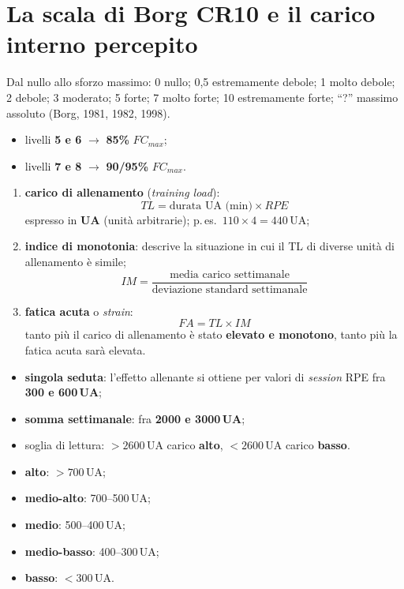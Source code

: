 \section{La scala di Borg CR10 e il carico interno percepito}

Dal nullo allo sforzo massimo: 0 nullo; 0,5 estremamente debole; 1 molto debole; 2 debole;
3 moderato; 5 forte; 7 molto forte; 10 estremamente forte; ``?'' massimo assoluto (Borg, 1981, 1982,
1998).

\begin{itemize}
  \item livelli \textbf{5 e 6} $\rightarrow$ \textbf{85\%} $FC_{max}$;
  \item livelli \textbf{7 e 8} $\rightarrow$ \textbf{90/95\%} $FC_{max}$.
\end{itemize}

\begin{enumerate}
  \item \textbf{carico di allenamento} (\textit{training load}):
    \[ TL = \textrm{durata UA (min)} \times RPE \]
    espresso in \textbf{UA} (unità arbitrarie); p.\,es.\ $110 \times 4 = 440$\,UA;
  \item \textbf{indice di monotonia}: descrive la situazione in cui il TL di diverse unità di
    allenamento è simile;
    \[ IM = \frac{\textrm{media carico settimanale}}{\textrm{deviazione standard settimanale}} \]
  \item \textbf{fatica acuta} o \textit{strain}:
    \[ FA = TL \times IM \]
    tanto più il carico di allenamento è stato \textbf{elevato e monotono}, tanto più la fatica acuta
    sarà elevata.
\end{enumerate}

\begin{itemize}
  \item \textbf{singola seduta}: l'effetto allenante si ottiene per valori di \textit{session} RPE
    fra \textbf{300 e 600\,UA};
  \item \textbf{somma settimanale}: fra \textbf{2000 e 3000\,UA};
  \item soglia di lettura: $>2600$\,UA carico \textbf{alto}, $<2600$\,UA carico \textbf{basso}.
\end{itemize}

\begin{itemize}
  \item \textbf{alto}: $>700$\,UA;
  \item \textbf{medio-alto}: 700--500\,UA;
  \item \textbf{medio}: 500--400\,UA;
  \item \textbf{medio-basso}: 400--300\,UA;
  \item \textbf{basso}: $<300$\,UA.
\end{itemize}

